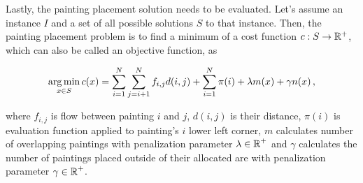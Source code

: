 \newpage

Lastly, the painting placement solution needs to be evaluated.
Let's assume an instance $I$ and a set of all possible solutions $S$ to that instance.
Then, the painting placement problem is to find a minimum of a cost function $c: S \to \operatorname*{\mathbb{R}^+}$,
which can also be called an objective function, as


%
%

\begin{equation}
    \operatorname*{arg\,min}_{x \in S} c(x) = \sum\limits_{i=1}^N\sum\limits_{j=i+1}^N f_{i,j}d(i, j) + \sum\limits_{i=1}^N \pi(i) + \lambda m(x) + \gamma n(x) \,,
\end{equation}

where $f_{i,j}$ is flow between painting $i$ and $j$, $d(i,j)$ is their distance,
$\pi(i)$ is evaluation function applied to painting's $i$ lower left corner,
$m$ calculates number of overlapping paintings with penalization parameter $\lambda \in \operatorname*{\mathbb{R}}^+$
and $\gamma$ calculates the number of paintings placed outside of their allocated are
with penalization parameter $\gamma \in \operatorname*{\mathbb{R}}^+$.